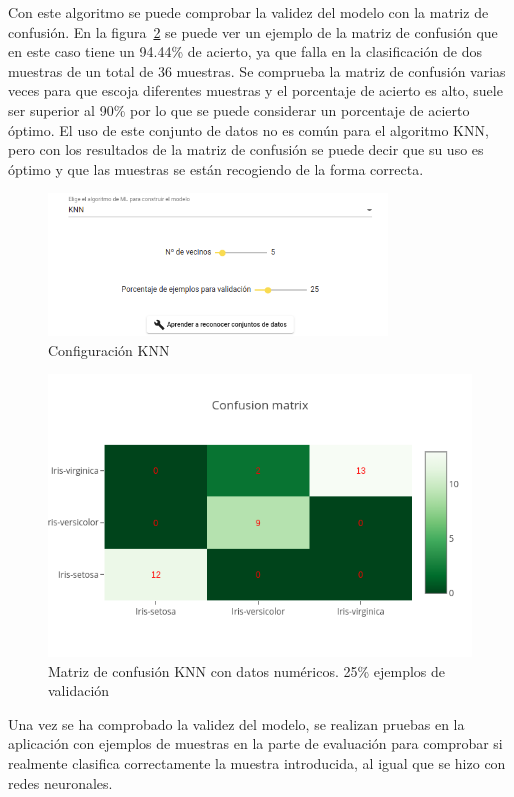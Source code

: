 \documentclass[a4paper, 12pt]{book}
\begin{document}
Con este algoritmo se puede comprobar la validez del modelo con la matriz de confusión. En la figura~\ref{fig:ejemplo12} se puede ver un ejemplo de la matriz de confusión que en este caso tiene un 94.44\% de acierto, ya que falla en la clasificación de dos muestras de un total de 36 muestras. Se comprueba la matriz de confusión varias veces para que escoja diferentes muestras y el porcentaje de acierto es alto, suele ser superior al 90\% por lo que se puede considerar un porcentaje de acierto óptimo. El uso de este conjunto de datos no es común para el algoritmo KNN, pero con los resultados de la matriz de confusión se puede decir que su uso es óptimo y que las muestras se están recogiendo de la forma correcta.

\begin{figure}
	\centering
	\includegraphics[width=9cm, keepaspectratio]{img/ej_num_knn.png}
	\caption{Configuración KNN} 	\label{fig:ejemplo11}
\end{figure}

\begin{figure}
	\centering
	\includegraphics[width=12cm, keepaspectratio]{img/cm_num_knn.png}
	\caption{Matriz de confusión KNN con datos numéricos. 25\% ejemplos de validación} 	
	\label{fig:ejemplo12}
\end{figure}

Una vez se ha comprobado la validez del modelo, se realizan pruebas en la aplicación con ejemplos de muestras en la parte de evaluación para comprobar si realmente clasifica correctamente la muestra introducida, al igual que se hizo con redes neuronales.
\end{document}
